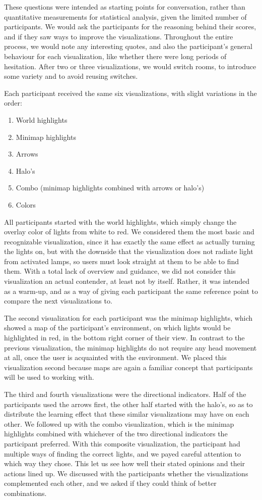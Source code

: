 These questions were intended as starting points for conversation, rather than quantitative measurements for statistical analysis, given the limited number of participants. We would ask the participants for the reasoning behind their scores, and if they saw ways to improve the visualizations. Throughout the entire process, we would note any interesting quotes, and also the participant's general behaviour for each visualization, like whether there were long periods of hesitation. After two or three visualizations, we would switch rooms, to introduce some variety and to avoid reusing switches.

Each participant received the same six visualizations, with slight variations in the order:
\begin{enumerate}
  \item World highlights
  \item Minimap highlights
  \item Arrows
  \item Halo's
  \item Combo (minimap highlights combined with arrows or halo's)
  \item Colors
\end{enumerate}

All participants started with the world highlights, which simply change the overlay color of lights from white to red. We considered them the most basic and recognizable visualization, since it has exactly the same effect as actually turning the lights on, but with the downside that the visualization does not radiate light from activated lamps, so users must look straight at them to be able to find them. With a total lack of overview and guidance, we did not consider this visualization an actual contender, at least not by itself. Rather, it was intended as a warm-up, and as a way of giving each participant the same reference point to compare the next visualizations to.

The second visualization for each participant was the minimap highlights, which showed a map of the participant's environment, on which lights would be highlighted in red, in the bottom right corner of their view. In contrast to the previous visualization, the minimap highlights do not require any head movement at all, once the user is acquainted with the environment. We placed this visualization second because maps are again a familiar concept that participants will be used to working with.

The third and fourth visualizations were the directional indicators. Half of the participants used the arrows first, the other half started with the halo's, so as to distribute the learning effect that these similar visualizations may have on each other. We followed up with the combo visualization, which is the minimap highlights combined with whichever of the two directional indicators the participant preferred. With this composite visualization, the participant had multiple ways of finding the correct lights, and we payed careful attention to which way they chose. This let us see how well their stated opinions and their actions lined up. We discussed with the participants whether the visualizations complemented each other, and we asked if they could think of better combinations.

